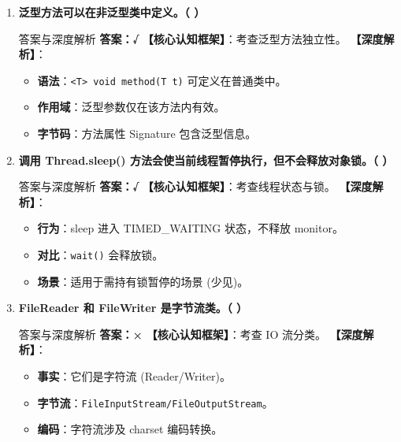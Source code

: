 \documentclass[12pt, a4paper]{ctexart}
\newcommand{\code}[1]{\texttt{\color{myblue}#1}}
\begin{document}
\begin{enumerate}[label=\arabic*.]
	\item \textbf{泛型方法可以在非泛型类中定义。（ \quad ）}
	      \begin{bluebox}{答案与深度解析}
		      \textbf{答案：√}
		      \textbf{【核心认知框架】}：考查泛型方法独立性。
		      \textbf{【深度解析】}：
		      \begin{itemize}[leftmargin=*, nosep]
			      \item \textbf{语法}：\code{<T> void method(T t)} 可定义在普通类中。
			      \item \textbf{作用域}：泛型参数仅在该方法内有效。
			      \item \textbf{字节码}：方法属性 Signature 包含泛型信息。
		      \end{itemize}
	      \end{bluebox}

	\item \textbf{调用 Thread.sleep() 方法会使当前线程暂停执行，但不会释放对象锁。（ \quad ）}
	      \begin{bluebox}{答案与深度解析}
		      \textbf{答案：√}
		      \textbf{【核心认知框架】}：考查线程状态与锁。
		      \textbf{【深度解析】}：
		      \begin{itemize}[leftmargin=*, nosep]
			      \item \textbf{行为}：sleep 进入 TIMED\_WAITING 状态，不释放 monitor。
			      \item \textbf{对比}：\code{wait()} 会释放锁。
			      \item \textbf{场景}：适用于需持有锁暂停的场景 (少见)。
		      \end{itemize}
	      \end{bluebox}

	\item \textbf{FileReader 和 FileWriter 是字节流类。（ \quad ）}
	      \begin{bluebox}{答案与深度解析}
		      \textbf{答案：×}
		      \textbf{【核心认知框架】}：考查 IO 流分类。
		      \textbf{【深度解析】}：
		      \begin{itemize}[leftmargin=*, nosep]
			      \item \textbf{事实}：它们是字符流 (Reader/Writer)。
			      \item \textbf{字节流}：\code{FileInputStream/FileOutputStream}。
			      \item \textbf{编码}：字符流涉及 charset 编码转换。
		      \end{itemize}
	      \end{bluebox}


\end{enumerate}
\end{document}
